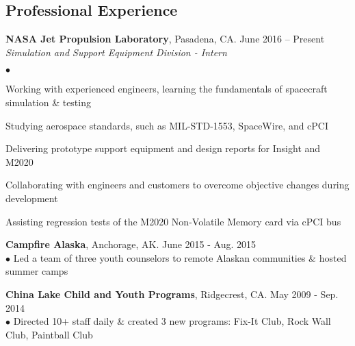 \documentclass[margin,line]{res}
\newenvironment{list2}{
  \begin{list}{$\bullet$}{%
      \setlength{\itemsep}{0in}
      \setlength{\parsep}{0in} \setlength{\parskip}{0in}
      \setlength{\topsep}{0in} \setlength{\partopsep}{0in}
      \setlength{\leftmargin}{0.2in}}}{\end{list}}
\begin{document}
\begin{resume}
\section{\sc Professional Experience}
{\bf NASA Jet Propulsion Laboratory}, Pasadena, CA.  \hfill{June 2016 -- Present}\\
{\em Simulation and Support Equipment Division - Intern}
\begin{list2} %
\item Working with experienced engineers, learning the fundamentals of spacecraft simulation \& testing
\item Studying aerospace standards, such as MIL-STD-1553, SpaceWire, and cPCI
\item Delivering prototype support equipment and design reports for Insight and M2020 
\item Collaborating with engineers and customers to overcome objective changes during development 
\item Assisting regression tests of the M2020 Non-Volatile Memory card via cPCI bus 
\end{list2}


{\bf Campfire Alaska}, Anchorage, AK. \hfill{June 2015 - Aug. 2015}\\
$\bullet$ Led a team of three youth counselors to remote Alaskan communities \& hosted summer camps



{\bf China Lake Child and Youth Programs}, Ridgecrest, CA. \hfill{May 2009 - Sep. 2014}\\
$\bullet$ Directed 10+ staff daily \& created 3 new programs:  Fix-It Club, Rock Wall Club, Paintball Club


\end{resume}
\end{document}
